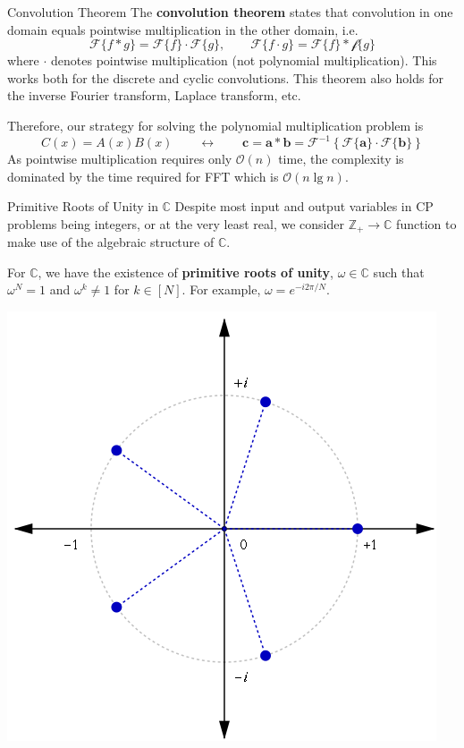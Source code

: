 \documentclass[10pt,table]{beamer}
\begin{document}
\begin{frame}{Convolution Theorem}
The \textbf{convolution theorem} states that convolution in one domain equals pointwise multiplication in the other domain, i.e.
\begin{equation*}
\mathcal{F}\{f*g\}=\mathcal{F}\{f\}\cdot\mathcal{F}\{g\},\qquad\mathcal{F}\{f\cdot g\}=\mathcal{F}\{f\}*\mathcal{f}\{g\}
\end{equation*}
where $\cdot$ denotes pointwise multiplication (not polynomial multiplication). This works both for the discrete and cyclic convolutions. This theorem also holds for the inverse Fourier transform, Laplace transform, etc.

\vfill

Therefore, our strategy for solving the polynomial multiplication problem is
\begin{equation*}
C(x)=A(x)B(x)\qquad\longleftrightarrow\qquad\mathbf{c}=\mathbf{a}*\mathbf{b}=\mathcal{F}^{-1}\left\{\mathcal{F}\{\mathbf{a}\}\cdot\mathcal{F}\{\mathbf{b}\}\right\}
\end{equation*}
As pointwise multiplication requires only $\mathcal{O}(n)$ time, the complexity is dominated by the time required for FFT which is $\mathcal{O}(n\lg n)$.
\end{frame}

\begin{frame}{Primitive Roots of Unity in $\mathbb{C}$}
Despite most input and output variables in CP problems being integers, or at the very least real, we consider $\mathbb{Z}_+\rightarrow\mathbb{C}$ function to make use of the algebraic structure of $\mathbb{C}$.

For $\mathbb{C}$, we have the existence of \textbf{primitive roots of unity}, $\omega\in\mathbb{C}$ such that $\omega^N=1$ and $\omega^k\neq 1$ for $k\in[N]$. For example, $\omega=e^{-i2\pi/N}$.

\vfill

\begin{center}
\includegraphics[width=0.36\linewidth]{roots.png}
\end{center}
\end{frame}
\end{document}
